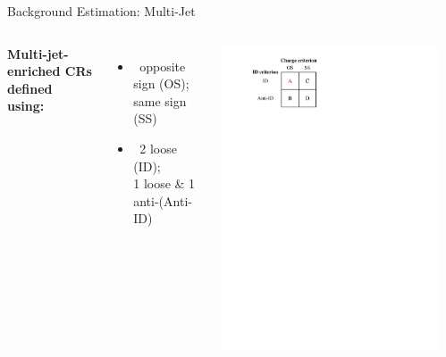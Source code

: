 \documentclass[11pt, xcolor={dvipsnames}, aspectratio=169]{beamer}
\begin{document}

\begin{frame}{Background Estimation: Multi-Jet}
  \begin{columns}[onlytextwidth]

    \textbf{Multi-jet-enriched CRs defined using:}
    \begin{itemize}
      \setlength{\itemsep}{0.5em}

    \item {}\ opposite sign (OS); same sign (SS)

    \item {}\ 2 loose \tauhadvis (ID);\\1 loose
      \tauhadvis \& 1 anti-\tauhadvis (Anti-ID)

    \end{itemize}


    \vspace*{1em}

    \hfill\includegraphics[width=0.92\textwidth]{ff_sketch}


\end{columns}
\end{frame}
\end{document}
